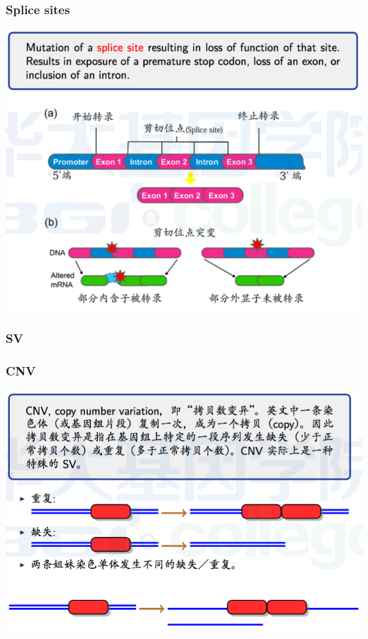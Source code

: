 \documentclass[12pt]{beamer}
\begin{document}
\begin{frame}\frametitle{Splice sites}
  \includegraphics[width=\textwidth]{figures/old_slides/splice.png}
\end{frame}

\begin{frame}\frametitle{SV}

\end{frame}

\begin{frame}\frametitle{CNV}
  \includegraphics[width=\textwidth]{figures/old_slides/cnv.png}
\end{frame}
\end{document}

